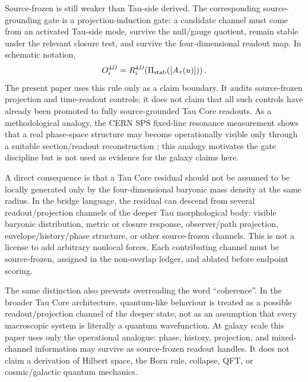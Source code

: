 \documentclass[11pt]{article}
\begin{document}
Source-frozen is still weaker than Tau-side derived.  The corresponding
source-grounding gate is a projection-induction gate: a candidate channel must
come from an activated Tau-side mode, survive the null/gauge quotient, remain
stable under the relevant closure test, and survive the four-dimensional
readout map.  In schematic notation,
\[
O_i^{4D}=R_i^{4D}\!\left(\Pi_{\rm stab}([A_\tau(u)])\right).
\]
The present paper uses this rule only as a claim boundary.  It audits
source-frozen projection and time-readout controls; it does not claim that all
such controls have already been promoted to fully source-grounded Tau Core
readouts.  As a methodological analogy, the CERN SPS fixed-line resonance
measurement shows that a real phase-space structure may become operationally
visible only through a suitable section/readout reconstruction
\cite{Bartosik2024FixedLines,CERN2024AcceleratorResonances4D}; this analogy
motivates the gate discipline but is not used as evidence for the galaxy
claims here.

A direct consequence is that a Tau Core residual should not be assumed to be
locally generated only by the four-dimensional baryonic mass density at the
same radius.  In the bridge language, the residual can descend from several
readout/projection channels of the deeper Tau morphological body: visible
baryonic distribution, metric or closure response, observer/path projection,
envelope/history/phase structure, or other source-frozen channels.  This is not
a license to add arbitrary nonlocal forces.  Each contributing channel must be
source-frozen, assigned in the non-overlap ledger, and ablated before endpoint
scoring.

The same distinction also prevents overreading the word ``coherence''.  In the
broader Tau Core architecture, quantum-like behaviour is treated as a possible
readout/projection channel of the deeper state, not as an assumption that every
macroscopic system is literally a quantum wavefunction.  At galaxy scale this
paper uses only the operational analogue: phase, history, projection, and
mixed-channel information may survive as source-frozen readout handles.  It
does not claim a derivation of Hilbert space, the Born rule, collapse, QFT, or
cosmic/galactic quantum mechanics.
\end{document}

